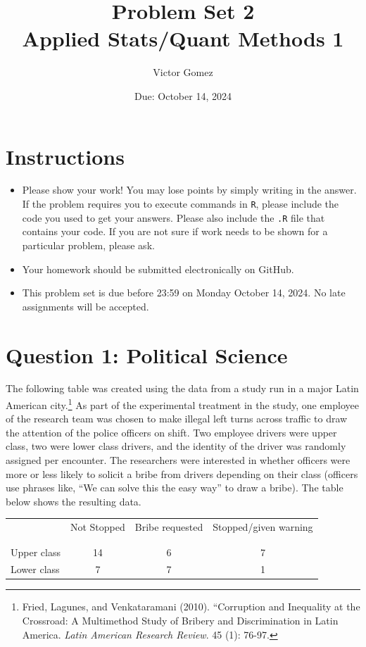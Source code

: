 \documentclass[12pt,letterpaper]{article}
\title{Problem Set 2 \\ \large Applied Stats/Quant Methods 1}
\date{Due: October 14, 2024}
\author{Victor Gomez}
\begin{document}
	\maketitle
	\section*{Instructions}
\begin{itemize}
	\item Please show your work! You may lose points by simply writing in the answer. If the problem requires you to execute commands in \texttt{R}, please include the code you used to get your answers. Please also include the \texttt{.R} file that contains your code. If you are not sure if work needs to be shown for a particular problem, please ask.
	\item Your homework should be submitted electronically on GitHub.
	\item This problem set is due before 23:59 on Monday October 14, 2024. No late assignments will be accepted.

\end{itemize}

	
	\vspace{.5cm}
	\section*{Question 1: Political Science}
		\vspace{.25cm}
	The following table was created using the data from a study run in a major Latin American city.\footnote{Fried, Lagunes, and Venkataramani (2010). ``Corruption and Inequality at the Crossroad: A Multimethod Study of Bribery and Discrimination in Latin America. \textit{Latin American Research Review}. 45 (1): 76-97.} As part of the experimental treatment in the study, one employee of the research team was chosen to make illegal left turns across traffic to draw the attention of the police officers on shift. Two employee drivers were upper class, two were lower class drivers, and the identity of the driver was randomly assigned per encounter. The researchers were interested in whether officers were more or less likely to solicit a bribe from drivers depending on their class (officers use phrases like, ``We can solve this the easy way'' to draw a bribe). The table below shows the resulting data.

\newpage
\begin{table}[h!]
	\centering
	\begin{tabular}{l | c c c }
		& Not Stopped & Bribe requested & Stopped/given warning \\
		\\[-1.8ex] 
		\hline \\[-1.8ex]
		Upper class & 14 & 6 & 7 \\
		Lower class & 7 & 7 & 1 \\
		\hline
	\end{tabular}
\end{table}
\end{document}
